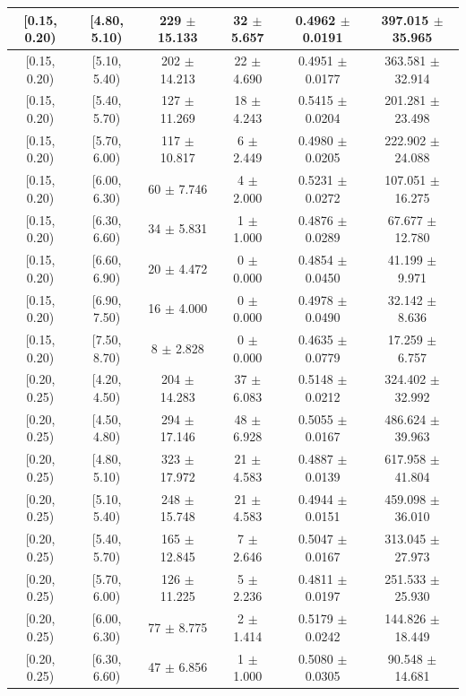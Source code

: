 \begin{longtable}{|c|c|c|c|c|c|}
\hline
[0.15, 0.20) & [4.80, 5.10) & 229 $\pm$ 15.133 & 32 $\pm$ 5.657 & 0.4962 $\pm$ 0.0191 & 397.015 $\pm$ 35.965 \\ 
\hline
[0.15, 0.20) & [5.10, 5.40) & 202 $\pm$ 14.213 & 22 $\pm$ 4.690 & 0.4951 $\pm$ 0.0177 & 363.581 $\pm$ 32.914 \\ 
\hline
[0.15, 0.20) & [5.40, 5.70) & 127 $\pm$ 11.269 & 18 $\pm$ 4.243 & 0.5415 $\pm$ 0.0204 & 201.281 $\pm$ 23.498 \\ 
\hline
[0.15, 0.20) & [5.70, 6.00) & 117 $\pm$ 10.817 & 6 $\pm$ 2.449 & 0.4980 $\pm$ 0.0205 & 222.902 $\pm$ 24.088 \\ 
\hline
[0.15, 0.20) & [6.00, 6.30) & 60 $\pm$ 7.746 & 4 $\pm$ 2.000 & 0.5231 $\pm$ 0.0272 & 107.051 $\pm$ 16.275 \\ 
\hline
[0.15, 0.20) & [6.30, 6.60) & 34 $\pm$ 5.831 & 1 $\pm$ 1.000 & 0.4876 $\pm$ 0.0289 & 67.677 $\pm$ 12.780 \\ 
\hline
[0.15, 0.20) & [6.60, 6.90) & 20 $\pm$ 4.472 & 0 $\pm$ 0.000 & 0.4854 $\pm$ 0.0450 & 41.199 $\pm$ 9.971 \\ 
\hline
[0.15, 0.20) & [6.90, 7.50) & 16 $\pm$ 4.000 & 0 $\pm$ 0.000 & 0.4978 $\pm$ 0.0490 & 32.142 $\pm$ 8.636 \\ 
\hline
[0.15, 0.20) & [7.50, 8.70) & 8 $\pm$ 2.828 & 0 $\pm$ 0.000 & 0.4635 $\pm$ 0.0779 & 17.259 $\pm$ 6.757 \\ 
\hline
[0.20, 0.25) & [4.20, 4.50) & 204 $\pm$ 14.283 & 37 $\pm$ 6.083 & 0.5148 $\pm$ 0.0212 & 324.402 $\pm$ 32.992 \\ 
\hline
[0.20, 0.25) & [4.50, 4.80) & 294 $\pm$ 17.146 & 48 $\pm$ 6.928 & 0.5055 $\pm$ 0.0167 & 486.624 $\pm$ 39.963 \\ 
\hline
[0.20, 0.25) & [4.80, 5.10) & 323 $\pm$ 17.972 & 21 $\pm$ 4.583 & 0.4887 $\pm$ 0.0139 & 617.958 $\pm$ 41.804 \\ 
\hline
[0.20, 0.25) & [5.10, 5.40) & 248 $\pm$ 15.748 & 21 $\pm$ 4.583 & 0.4944 $\pm$ 0.0151 & 459.098 $\pm$ 36.010 \\ 
\hline
[0.20, 0.25) & [5.40, 5.70) & 165 $\pm$ 12.845 & 7 $\pm$ 2.646 & 0.5047 $\pm$ 0.0167 & 313.045 $\pm$ 27.973 \\ 
\hline
[0.20, 0.25) & [5.70, 6.00) & 126 $\pm$ 11.225 & 5 $\pm$ 2.236 & 0.4811 $\pm$ 0.0197 & 251.533 $\pm$ 25.930 \\ 
\hline
[0.20, 0.25) & [6.00, 6.30) & 77 $\pm$ 8.775 & 2 $\pm$ 1.414 & 0.5179 $\pm$ 0.0242 & 144.826 $\pm$ 18.449 \\ 
\hline
[0.20, 0.25) & [6.30, 6.60) & 47 $\pm$ 6.856 & 1 $\pm$ 1.000 & 0.5080 $\pm$ 0.0305 & 90.548 $\pm$ 14.681 \\ 

\end{longtable}
